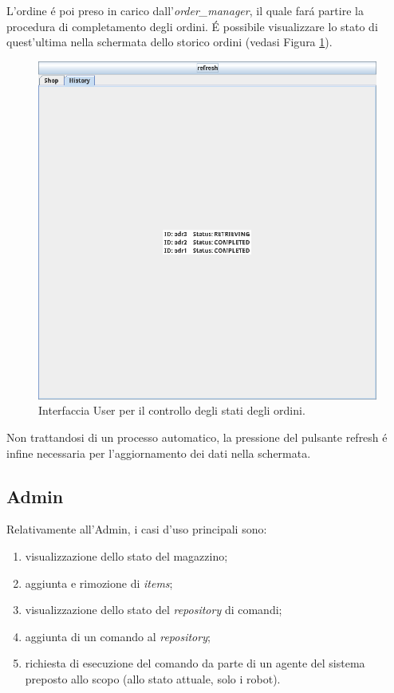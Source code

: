 L'ordine \'e poi preso in carico dall'\textit{order\_manager}, il quale far\'a partire la procedura di completamento degli ordini. \'E possibile visualizzare lo stato di quest'ultima nella schermata dello storico ordini (vedasi Figura \ref{fig:application-history}).
\begin{figure}[!ht]\centering
    \includegraphics[width=.75\textwidth]{section/usage_examples/figure/application-history.png}
    \caption{Interfaccia User per il controllo degli stati degli ordini.}
    \label{fig:application-history}
\end{figure}

Non trattandosi di un processo automatico, la pressione del pulsante refresh \'e infine necessaria per l'aggiornamento dei dati nella schermata.

\subsection{Admin}
Relativamente all'Admin, i casi d'uso principali sono:
\begin{enumerate}
    \item visualizzazione dello stato del magazzino;
    \item aggiunta e rimozione di \textit{items};
    \item visualizzazione dello stato del \textit{repository} di comandi;
    \item aggiunta di un comando al \textit{repository};
    \item richiesta di esecuzione del comando da parte di un agente del sistema preposto allo scopo (allo stato attuale, solo i robot).
\end{enumerate}

